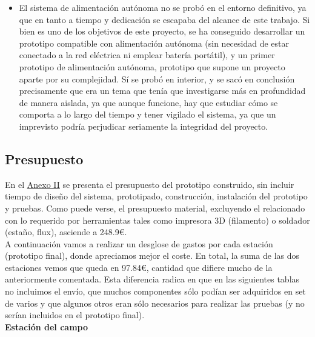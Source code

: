 \documentclass[12pt]{article}
\begin{document}
\begin{itemize}
		\item El sistema de alimentación autónoma no se probó en el entorno definitivo, ya que en tanto a tiempo y dedicación se escapaba del alcance de este trabajo. Si bien es uno de los objetivos de este proyecto, se ha conseguido desarrollar un prototipo compatible con alimentación autónoma (sin necesidad de estar conectado a la red eléctrica ni emplear batería portátil), y un primer prototipo de alimentación autónoma, prototipo que supone un proyecto aparte por su complejidad. Sí se probó en interior, y se sacó en conclusión precisamente que era un tema que tenía que investigarse más en profundidad de manera aislada, ya que aunque funcione, hay que estudiar cómo se comporta a lo largo del tiempo y tener vigilado el sistema, ya que un imprevisto podría perjudicar seriamente la integridad del proyecto.
	\end{itemize}
	
	\pagebreak
	
	\subsection[Presupuesto]{Presupuesto}

	\noindent En el \hyperref[anexo II: presupuesto]{Anexo II} se presenta el presupuesto del prototipo construido, sin incluir tiempo de diseño del sistema, prototipado, construcción, instalación del prototipo y pruebas. Como puede verse, el presupuesto material, excluyendo el relacionado con lo requerido por herramientas tales como impresora 3D (filamento) o soldador (estaño, flux), asciende a 248.9\euro.\\
	
	\noindent A continuación vamos a realizar un desglose de gastos por cada estación (prototipo final), donde apreciamos mejor el coste. En total, la suma de las dos estaciones vemos que queda en 97.84\euro, cantidad que difiere mucho de la anteriormente comentada. Esta diferencia radica en que en las siguientes tablas no incluimos el envío, que muchos componentes sólo podían ser adquiridos en set de varios y que algunos otros eran sólo necesarios para realizar las pruebas (y no serían incluidos en el prototipo final). \\
	
	\noindent \textbf{Estación del campo}\\
	
\end{document}
